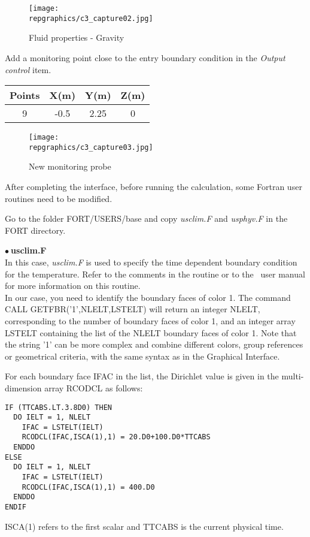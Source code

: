 \begin{figure}[h!]
\begin{center}
\texttt{[image: \\repgraphics/c3\_capture02.jpg]}
\caption{Fluid properties - Gravity}
\label{fig2_e3}
\end{center}
\end{figure}


\newpage
Add a monitoring point close to the entry boundary condition in the
{\itshape Output control} item.

\begin{center}
\begin{tabular}{|c|c|c|c|}
\hline
Points & X(m) & Y(m) & Z(m)\\
\hline
9 & -0.5 & 2.25 & 0 \\
\hline
\end{tabular}
\end{center}

\begin{figure}[h!]
\begin{center}
\texttt{[image: \\repgraphics/c3\_capture03.jpg]}
\caption{New monitoring probe}
\label{fig3_e3}
\end{center}
\end{figure}


\newpage
After completing the interface, before running the calculation,
some Fortran user routines need to be modified.

Go to the folder FORT/USERS/base and copy {\itshape usclim.F} and
{\itshape usphyv.F} in the FORT directory.

$\bullet\ $\textbf{usclim.F}\\
In this case, {\itshape usclim.F} is used to specify the time dependent boundary
condition for
the temperature. Refer to the comments in the routine or to the \CS\ user manual
for more information on this routine.\\
In our case, you need to identify the boundary faces of color 1. The command\\
CALL GETFBR('1',NLELT,LSTELT)
will return an integer NLELT, corresponding to the number of boundary faces of
color 1, and an integer array LSTELT containing the list of the NLELT boundary
faces of color 1. Note that the string '1' can be more complex and combine
different colors, group references or geometrical criteria, with the same syntax
as in the Graphical Interface.

For each boundary face IFAC in the list, the Dirichlet value is given in the
multi-dimension array RCODCL as follows:
\begin{verbatim}
IF (TTCABS.LT.3.8D0) THEN
  DO IELT = 1, NLELT
    IFAC = LSTELT(IELT)
    RCODCL(IFAC,ISCA(1),1) = 20.D0+100.D0*TTCABS
  ENDDO
ELSE
  DO IELT = 1, NLELT
    IFAC = LSTELT(IELT)
    RCODCL(IFAC,ISCA(1),1) = 400.D0
  ENDDO
ENDIF
\end{verbatim}
ISCA(1) refers to the first scalar and TTCABS is the current physical time.

